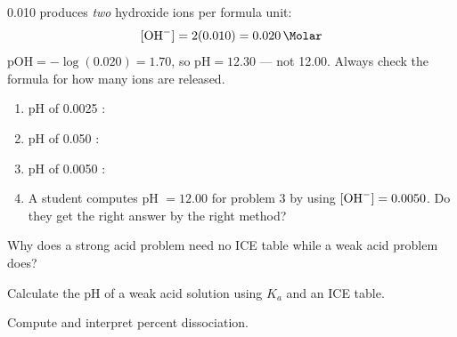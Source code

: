 \documentclass{apchem-notes}
\begin{document}
\begin{workedexample}
\SI{0.010}{\Molar}  produces \emph{two} hydroxide ions per
formula unit:
\[
  [\ce{OH-}] = 2(0.010) = \SI{0.020}{\Molar}
\]
$\mathrm{pOH} = -\log(0.020) = 1.70$, so $\mathrm{pH} = \mathbf{12.30}$ ---
not 12.00. Always check the formula for how many ions are released.
\end{workedexample}


\begin{enumerate}[leftmargin=*,itemsep=0.4em]
  \item pH of \SI{0.0025}{\Molar} :
  \item pH of \SI{0.050}{\Molar} :
  \item pH of \SI{0.0050}{\Molar} : \workspace[2cm]
  \item A student computes pH $= 12.00$ for problem 3 by using
        $[\ce{OH-}] = 0.0050$. Do they get the right answer by the right
        method? 
\end{enumerate}

\begin{exitticket}
Why does a strong acid problem need no ICE table while a weak acid problem
does? 
\end{exitticket}


\begin{objectives}
  \item Calculate the pH of a weak acid solution using $K_a$ and an ICE
        table.
  \item Compute and interpret percent dissociation.
\end{objectives}
\end{document}
